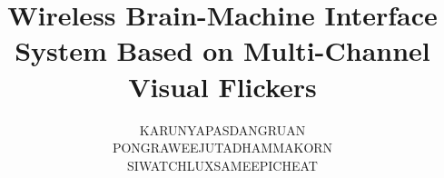 \documentclass[a4paper,12pt,twoside]{report}
\begin{document}
\title{\LARGE {\bf Wireless Brain-Machine Interface System Based on Multi-Channel Visual Flickers}\\
 \vspace*{6mm}
}

\author{KARUNYAPAS\qquad DANGRUAN\\
PONGRAWEE\qquad JUTADHAMMAKORN\\
SIWATCH\qquad LUXSAMEEPICHEAT\\}


\normallinespacing
\maketitle
\preface


%
%

\body









\appendix




\end{document}
